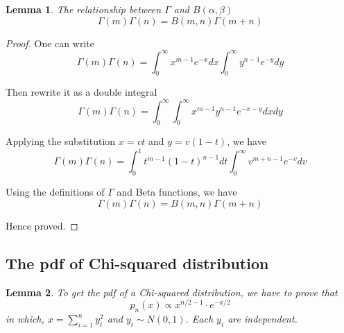 \documentclass[a4paper]{article}
\newtheorem{lemma}{Lemma}[section]
\begin{document}
\begin{lemma} \label{lemma: The relationship between Gamma and Beta}
    The relationship between $\Gamma$ and $B(\alpha, \beta)$
    \begin{equation*}
        \Gamma(m)\Gamma(n) = B(m, n) \Gamma(m+n)
    \end{equation*}

\end{lemma}

\begin{proof}
    One can write
    \begin{equation*}
        \Gamma(m)\Gamma(n) = \int_{0}^{\infty} x^{m-1} e^{-x} dx \int_{0}^{\infty} y^{n-1} e^{-y} dy
    \end{equation*}

    Then rewrite it as a double integral
    \begin{equation*}
        \Gamma(m)\Gamma(n) = \int_{0}^{\infty} \int_{0}^{\infty} x^{m-1} y^{n-1} e^{-x-y} dx dy
    \end{equation*}

    Applying the substitution $x=vt$ and $y=v(1-t)$, we have
    \begin{equation*}
        \Gamma(m)\Gamma(n) = \int_{0}^{1} t^{m-1} (1-t)^{n-1} dt \int_{0}^{\infty} v^{m+n-1} e^{-v} dv
    \end{equation*}

    Using the definitions of $\Gamma$ and Beta functions, we have
    \begin{equation*}
        \Gamma(m)\Gamma(n) = B(m, n) \Gamma(m+n)
    \end{equation*}

    Hence proved.

\end{proof}

\subsection{The pdf of Chi-squared distribution}

\begin{lemma} \label{lemma: Compute the pdf of Chi-squared distribution}
    To get the pdf of a Chi-squared distribution, we have to prove that
    \begin{equation*}
        p_{n}(x) \propto x^{n/2-1} \cdot e^{-x/2}
    \end{equation*}
    in which, $x = \sum_{i=1}^{n} y_i^2$ and $y_i \sim N(0, 1)$.
    Each $y_i$ are independent.

\end{lemma}
\end{document}
